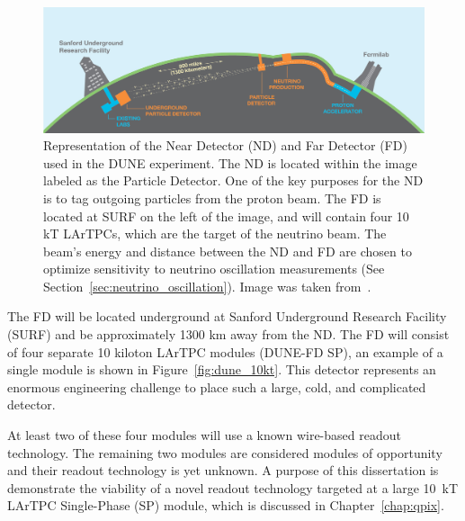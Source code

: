 \begin{figure}[]
\centering
\includegraphics[width=\textwidth]{images/LBNE_Graphic_061615_2016.jpg}
\caption{Representation of the Near Detector (ND) and Far Detector (FD) used in the DUNE experiment.
The ND is located within the image labeled as the Particle Detector.
One of the key purposes for the ND is to tag outgoing particles from the proton beam.
The FD is located at SURF on the left of the image, and will contain four 10 kT LArTPCs, which are the target of the neutrino beam.
The beam's energy and distance between the ND and FD are chosen to optimize sensitivity to neutrino oscillation measurements (See Section~\ref{sec:neutrino_oscillation}).
Image was taken from~\citep{dune_cdr_2016_arxiv}.}
\label{fig:dune_fd_image}
\end{figure}


The FD will be located underground at Sanford Underground Research Facility (SURF) and be approximately 1300 km away from the ND.
The FD will consist of four separate 10 kiloton LArTPC modules (DUNE-FD SP), an example of a single module is shown in Figure~\ref{fig:dune_10kt}.
This detector represents an enormous engineering challenge to place such a large, cold, and complicated detector.

At least two of these four modules will use a known wire-based readout technology.
The remaining two modules are considered modules of opportunity and their readout technology is yet unknown.
A purpose of this dissertation is demonstrate the viability of a novel readout technology targeted at a large 10~\unit{kT} LArTPC Single-Phase (SP) module, which is discussed in Chapter~\ref{chap:qpix}.

